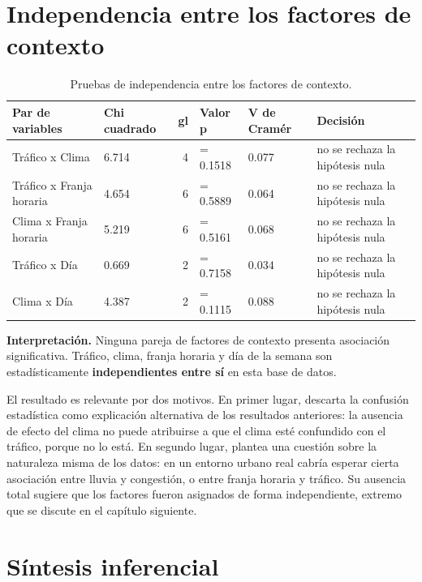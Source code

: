 \documentclass[
]{book}
\begin{document}
\section{Independencia entre los factores de contexto}\label{independencia-entre-los-factores-de-contexto}

\begin{table}

\caption{\label{tab:indep-factores}Pruebas de independencia entre los factores de contexto.}
\centering
\begin{tabular}[t]{l|l|r|l|l|l}
\hline
Par de variables & Chi cuadrado & gl & Valor p & V de Cramér & Decisión\\
\hline
Tráfico x Clima & 6.714 & 4 & = 0.1518 & 0.077 & no se rechaza la hipótesis nula\\
\hline
Tráfico x Franja horaria & 4.654 & 6 & = 0.5889 & 0.064 & no se rechaza la hipótesis nula\\
\hline
Clima x Franja horaria & 5.219 & 6 & = 0.5161 & 0.068 & no se rechaza la hipótesis nula\\
\hline
Tráfico x Día & 0.669 & 2 & = 0.7158 & 0.034 & no se rechaza la hipótesis nula\\
\hline
Clima x Día & 4.387 & 2 & = 0.1115 & 0.088 & no se rechaza la hipótesis nula\\
\hline
\end{tabular}
\end{table}

\textbf{Interpretación.} Ninguna pareja de factores de contexto presenta asociación significativa.
Tráfico, clima, franja horaria y día de la semana son estadísticamente \textbf{independientes entre
sí} en esta base de datos.

El resultado es relevante por dos motivos. En primer lugar, descarta la confusión estadística
como explicación alternativa de los resultados anteriores: la ausencia de efecto del clima no
puede atribuirse a que el clima esté confundido con el tráfico, porque no lo está. En segundo
lugar, plantea una cuestión sobre la naturaleza misma de los datos: en un entorno urbano real
cabría esperar cierta asociación entre lluvia y congestión, o entre franja horaria y tráfico.
Su ausencia total sugiere que los factores fueron asignados de forma independiente, extremo
que se discute en el capítulo siguiente.

\section{Síntesis inferencial}\label{suxedntesis-inferencial}
\end{document}
